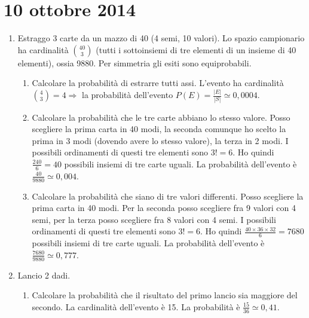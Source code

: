 \section{10 ottobre 2014}

\begin{enumerate}
    \item Estraggo 3 carte da un mazzo di 40 (4 semi, 10 valori). Lo spazio campionario ha cardinalit\`a $\binom{40}{3}$ (tutti i sottoinsiemi di tre elementi di un insieme di 40 elementi), ossia 9880. Per simmetria gli esiti sono equiprobabili.
    \begin{enumerate}
        \item Calcolare la probabilit\`a di estrarre tutti assi. L'evento ha cardinalit\`a $\binom{4}{3} = 4 \Rightarrow $ la probabilit\`a dell'evento $P(E) = \frac{|E|}{|S|} \simeq 0{,}0004$.
        \item Calcolare la probabilit\`a che le tre carte abbiano lo stesso valore. Posso scegliere la prima carta in 40 modi, la seconda comunque ho scelto la prima in 3 modi (dovendo avere lo stesso valore), la terza in 2 modi. I possibili ordinamenti di questi tre elementi sono $3! = 6$. Ho quindi $\frac{240}{6} = 40$ possibili insiemi di tre carte uguali. La probabilit\`a dell'evento \`e $\frac{40}{9880} \simeq 0{,}004$.
        \item Calcolare la probabilit\`a che siano di tre valori differenti. Posso scegliere la prima carta in 40 modi. Per la seconda posso scegliere fra 9 valori con 4 semi, per la terza posso scegliere fra 8 valori con 4 semi. I possibili ordinamenti di questi tre elementi sono $3! = 6$. Ho quindi $\frac{40 \times 36 \times 32}{6} = 7680$ possibili insiemi di tre carte uguali. La probabilit\`a dell'evento \`e $\frac{7680}{9880} \simeq 0{,}777$.
    \end{enumerate}
    \item Lancio 2 dadi.
    \begin{enumerate}
        \item Calcolare la probabilit\`a che il risultato del primo lancio sia maggiore del secondo. La cardinalit\`a dell'evento \`e 15. La probabilit\`a \`e $\frac{15}{36} \simeq 0{,}41$.
    \end{enumerate}
\end{enumerate}